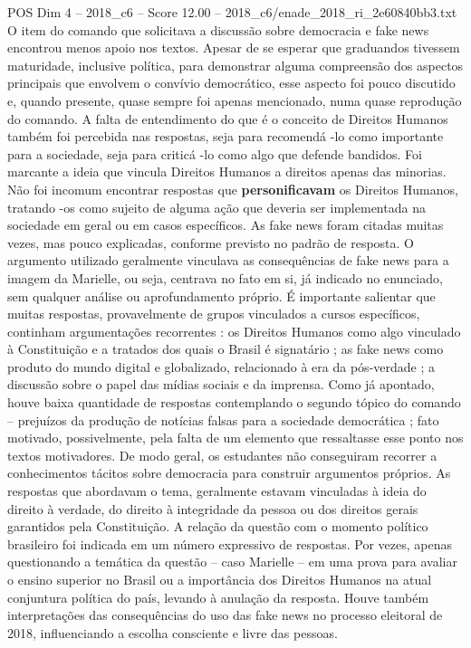 \begin{textsample}{POS Dim 4 – 2018\_c6 – Score 12.00 – 2018\_c6/enade\_2018\_ri\_2e60840bb3.txt}
O item do comando que solicitava a discussão sobre democracia e fake news encontrou menos apoio nos textos.
Apesar de se esperar que graduandos tivessem maturidade, inclusive política, para demonstrar alguma compreensão dos aspectos principais que envolvem o convívio democrático, esse aspecto foi pouco discutido e, quando presente, quase sempre foi apenas mencionado, numa quase reprodução do comando.
A falta de entendimento do que é o conceito de Direitos Humanos também foi percebida nas respostas, seja para recomendá -lo como importante para a sociedade, seja para criticá -lo como algo que defende bandidos.
Foi marcante a ideia que vincula Direitos Humanos a direitos apenas das minorias.
Não foi incomum encontrar respostas que \textbf{personificavam} os Direitos Humanos, tratando -os como sujeito de alguma ação que deveria ser implementada na sociedade em geral ou em casos específicos.
As fake news foram citadas muitas vezes, mas pouco explicadas, conforme previsto no padrão de resposta.
O argumento utilizado geralmente vinculava as consequências de fake news para a imagem da Marielle, ou seja, centrava no fato em si, já indicado no enunciado, sem qualquer análise ou aprofundamento próprio.
É importante salientar que muitas respostas, provavelmente de grupos vinculados a cursos específicos, continham argumentações recorrentes : os Direitos Humanos como algo vinculado à Constituição e a tratados dos quais o Brasil é signatário ; as fake news como produto do mundo digital e globalizado, relacionado à era da pós-verdade ; a discussão sobre o papel das mídias sociais e da imprensa.
Como já apontado, houve baixa quantidade de respostas contemplando o segundo tópico do comando – prejuízos da produção de notícias falsas para a sociedade democrática ; fato motivado, possivelmente, pela falta de um elemento que ressaltasse esse ponto nos textos motivadores.
De modo geral, os estudantes não conseguiram recorrer a conhecimentos tácitos sobre democracia para construir argumentos próprios.
As respostas que abordavam o tema, geralmente estavam vinculadas à ideia do direito à verdade, do direito à integridade da pessoa ou dos direitos gerais garantidos pela Constituição.
A relação da questão com o momento político brasileiro foi indicada em um número expressivo de respostas.
Por vezes, apenas questionando a temática da questão – caso Marielle – em uma prova para avaliar o ensino superior no Brasil ou a importância dos Direitos Humanos na atual conjuntura política do país, levando à anulação da resposta.
Houve também interpretações das consequências do uso das fake news no processo eleitoral de 2018, influenciando a escolha consciente e livre das pessoas.

\end{textsample}
